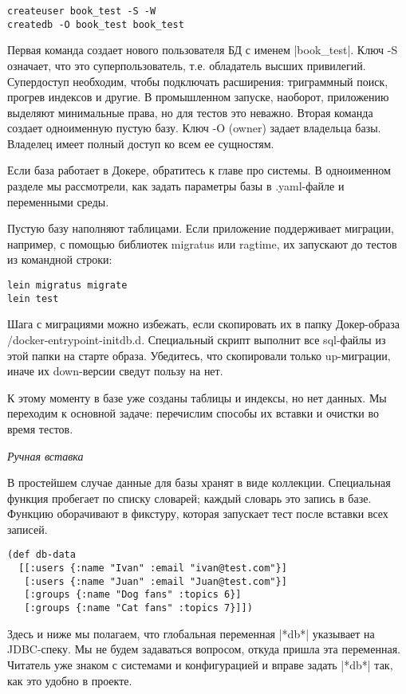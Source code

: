 \begin{verbatim}
createuser book_test -S -W
createdb -O book_test book_test
\end{verbatim}

Первая команда создает нового пользователя БД с именем \spverb|book_test|. Ключ -S
означает, что это суперпользователь, т.е. обладатель высших
привилегий. Супердоступ необходим, чтобы подключать расширения: триграммный
поиск, прогрев индексов и другие. В промышленном запуске, наоборот, приложению
выделяют минимальные права, но для тестов это неважно. Вторая команда создает
одноименную пустую базу. Ключ -O (owner) задает владельца базы. Владелец имеет
полный доступ ко всем ее сущностям.

Если база работает в Докере, обратитесь к главе про системы. В одноименном
разделе мы рассмотрели, как задать параметры базы в .yaml-файле и переменными
среды.

Пустую базу наполняют таблицами. Если приложение поддерживает миграции,
например, с помощью библиотек migratus или ragtime, их запускают до тестов из
командной строки:

\begin{verbatim}
lein migratus migrate
lein test
\end{verbatim}

Шага с миграциями можно избежать, если скопировать их в папку Докер-образа
/docker-entrypoint-initdb.d. Специальный скрипт выполнит все sql-файлы из этой
папки на старте образа. Убедитесь, что скопировали только up-миграции, иначе их
down-версии сведут пользу на нет.

К этому моменту в базе уже созданы таблицы и индексы, но нет данных. Мы
переходим к основной задаче: перечислим способы их вставки и очистки во время
тестов.

\emph{Ручная вставка}

В простейшем случае данные для базы хранят в виде коллекции. Специальная функция
пробегает по списку словарей; каждый словарь это запись в базе. Функцию
оборачивают в фикстуру, которая запускает тест после вставки всех записей.

\begin{verbatim}
(def db-data
  [[:users {:name "Ivan" :email "ivan@test.com"}]
   [:users {:name "Juan" :email "Juan@test.com"}]
   [:groups {:name "Dog fans" :topics 6}]
   [:groups {:name "Cat fans" :topics 7}]])
\end{verbatim}

Здесь и ниже мы полагаем, что глобальная переменная \spverb|*db*| указывает на
JDBC-спеку. Мы не будем задаваться вопросом, откуда пришла эта
переменная. Читатель уже знаком с системами и конфигурацией и вправе задать
\spverb|*db*| так, как это удобно в проекте.

